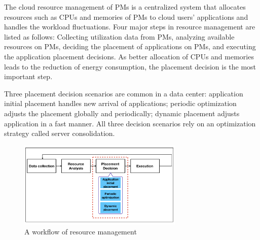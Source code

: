 The cloud resource management of PMs is a centralized system \cite{Jennings:2015ht} that allocates resources such as CPUs and memories of PMs to cloud users' applications and handles the workload fluctuations. Four major steps in resource management are listed as follows: Collecting utilization data from PMs, analyzing available resources on PMs, deciding the placement of applications on PMs, and executing the application placement decisions.  As better allocation of CPUs and memories leads to the reduction of energy consumption, the placement decision is the most important step.

 Three placement decision scenarios are common in a data center: application initial placement handles new arrival of applications; periodic optimization adjusts the placement globally and periodically; dynamic placement adjusts application in a fast manner. All three decision scenarios rely on an optimization strategy called server consolidation. 
\begin{figure}
	\centering
	\includegraphics[width=0.7\textwidth]{pics/workflow_management.png}
	\caption{A workflow of resource management \cite{Mishra:2012kx}}
	\label{fig:workflow}
\end{figure}




